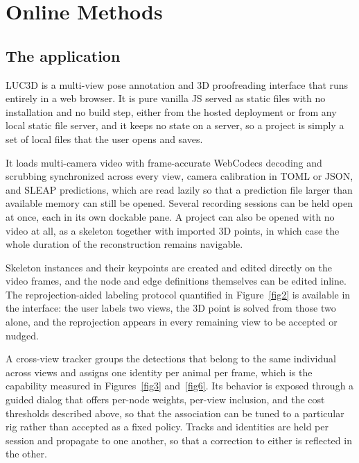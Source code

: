 \documentclass[pdflatex, sn-nature]{sn-jnl}
\theoremstyle{thmstyleone}%
\theoremstyle{thmstyletwo}%
\theoremstyle{thmstylethree}%
\begin{document}
\section{Online Methods}\label{sec4}

\subsection{The application}\label{methods-app}

LUC3D is a multi-view pose annotation and 3D proofreading interface that runs entirely in a web browser. It is pure vanilla JS served as static files with no installation and no build step, either from the hosted deployment or from any local static file server, and it keeps no state on a server, so a project is simply a set of local files that the user opens and saves.

It loads multi-camera video with frame-accurate WebCodecs decoding and scrubbing synchronized across every view, camera calibration in TOML or JSON, and SLEAP predictions, which are read lazily so that a prediction file larger than available memory can still be opened. Several recording sessions can be held open at once, each in its own dockable pane. A project can also be opened with no video at all, as a skeleton together with imported 3D points, in which case the whole duration of the reconstruction remains navigable.

Skeleton instances and their keypoints are created and edited directly on the video frames, and the node and edge definitions themselves can be edited inline. The reprojection-aided labeling protocol quantified in Figure~\ref{fig2} is available in the interface: the user labels two views, the 3D point is solved from those two alone, and the reprojection appears in every remaining view to be accepted or nudged.

A cross-view tracker groups the detections that belong to the same individual across views and assigns one identity per animal per frame, which is the capability measured in Figures~\ref{fig3} and~\ref{fig6}. Its behavior is exposed through a guided dialog that offers per-node weights, per-view inclusion, and the cost thresholds described above, so that the association can be tuned to a particular rig rather than accepted as a fixed policy. Tracks and identities are held per session and propagate to one another, so that a correction to either is reflected in the other.
\end{document}
